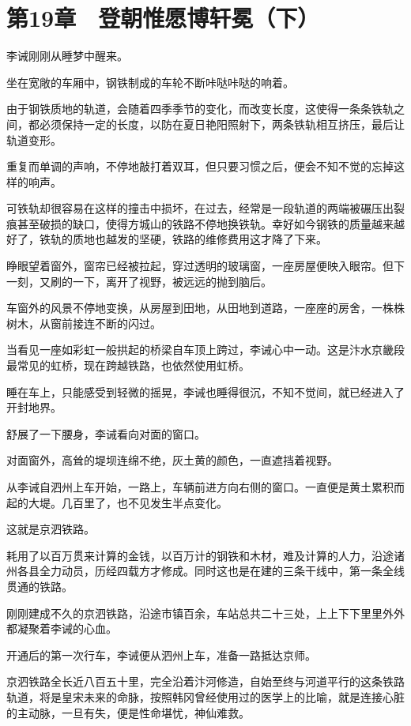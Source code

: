 \section{第19章　登朝惟愿博轩冕（下）}

李诫刚刚从睡梦中醒来。

坐在宽敞的车厢中，钢铁制成的车轮不断咔哒咔哒的响着。

由于钢铁质地的轨道，会随着四季季节的变化，而改变长度，这使得一条条铁轨之间，都必须保持一定的长度，以防在夏日艳阳照射下，两条铁轨相互挤压，最后让轨道变形。

重复而单调的声响，不停地敲打着双耳，但只要习惯之后，便会不知不觉的忘掉这样的响声。

可铁轨却很容易在这样的撞击中损坏，在过去，经常是一段轨道的两端被碾压出裂痕甚至破损的缺口，使得方城山的铁路不停地换铁轨。幸好如今钢铁的质量越来越好了，铁轨的质地也越发的坚硬，铁路的维修费用这才降了下来。

睁眼望着窗外，窗帘已经被拉起，穿过透明的玻璃窗，一座房屋便映入眼帘。但下一刻，又刷的一下，离开了视野，被远远的抛到脑后。

车窗外的风景不停地变换，从房屋到田地，从田地到道路，一座座的房舍，一株株树木，从窗前接连不断的闪过。

当看见一座如彩虹一般拱起的桥梁自车顶上跨过，李诫心中一动。这是汴水京畿段最常见的虹桥，现在跨越铁路，也依然使用虹桥。

睡在车上，只能感受到轻微的摇晃，李诫也睡得很沉，不知不觉间，就已经进入了开封地界。

舒展了一下腰身，李诫看向对面的窗口。

对面窗外，高耸的堤坝连绵不绝，灰土黄的颜色，一直遮挡着视野。

从李诫自泗州上车开始，一路上，车辆前进方向右侧的窗口。一直便是黄土累积而起的大堤。几百里了，也不见发生半点变化。

这就是京泗铁路。

耗用了以百万贯来计算的金钱，以百万计的钢铁和木材，难及计算的人力，沿途诸州各县全力动员，历经四载方才修成。同时这也是在建的三条干线中，第一条全线贯通的铁路。

刚刚建成不久的京泗铁路，沿途市镇百余，车站总共二十三处，上上下下里里外外都凝聚着李诫的心血。

开通后的第一次行车，李诫便从泗州上车，准备一路抵达京师。

京泗铁路全长近八百五十里，完全沿着汴河修造，自始至终与河道平行的这条铁路轨道，将是皇宋未来的命脉，按照韩冈曾经使用过的医学上的比喻，就是连接心脏的主动脉，一旦有失，便是性命堪忧，神仙难救。

